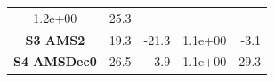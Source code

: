 \documentclass[]{article}
\begin{document}
\begin{longtable}[]{@{}crrrr@{}}
\begin{minipage}[t]{0.18\columnwidth}
1.2e+00\strut
\end{minipage} & \begin{minipage}[t]{0.08\columnwidth}\raggedleft\strut
25.3\strut
\end{minipage}\tabularnewline
\begin{minipage}[t]{0.18\columnwidth}\centering\strut
\textbf{S3 AMS2}\strut
\end{minipage} & \begin{minipage}[t]{0.15\columnwidth}\raggedleft\strut
19.3\strut
\end{minipage} & \begin{minipage}[t]{0.26\columnwidth}\raggedleft\strut
-21.3\strut
\end{minipage} & \begin{minipage}[t]{0.18\columnwidth}\raggedleft\strut
1.1e+00\strut
\end{minipage} & \begin{minipage}[t]{0.08\columnwidth}\raggedleft\strut
-3.1\strut
\end{minipage}\tabularnewline
\begin{minipage}[t]{0.18\columnwidth}\centering\strut
\textbf{S4 AMSDec0}\strut
\end{minipage} & \begin{minipage}[t]{0.15\columnwidth}\raggedleft\strut
26.5\strut
\end{minipage} & \begin{minipage}[t]{0.26\columnwidth}\raggedleft\strut
3.9\strut
\end{minipage} & \begin{minipage}[t]{0.18\columnwidth}\raggedleft\strut
1.1e+00\strut
\end{minipage} & \begin{minipage}[t]{0.08\columnwidth}\raggedleft\strut
29.3\strut
\end{minipage}\tabularnewline
\bottomrule
\end{longtable}
\end{document}

